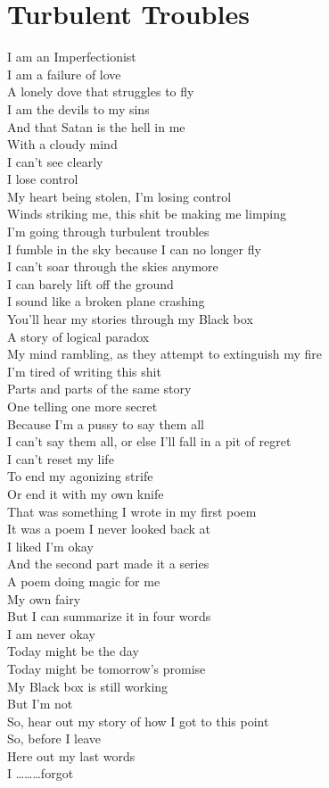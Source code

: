 \documentclass[12pt, b5paper]{article}
\begin{document}
\section{Turbulent Troubles}
I am an Imperfectionist\\
I am a failure of love\\ 
A lonely dove that struggles to fly\\
I am the devils to my sins\\ 
And that Satan is the hell in me\\ 
With a cloudy mind\\ 
I can’t see clearly\\ 
I lose control\\
My heart being stolen, I’m losing control\\
Winds striking me, this shit be making me limping\\ 
I’m going through turbulent troubles\\
I fumble in the sky because I can no longer fly\\ 
I can’t soar through the skies anymore\\
I can barely lift off the ground\\
I sound like a broken plane crashing\\
You’ll hear my stories through my Black box\\ 
A story of logical paradox\\ 
My mind rambling, as they attempt to extinguish my fire\\ 
I’m tired of writing this shit\\
Parts and parts of the same story\\
One telling one more secret\\ 
Because I’m a pussy to say them all\\
I can’t say them all, or else I’ll fall in a pit of regret\\
I can’t reset my life\\ 
To end my agonizing strife\\
Or end it with my own knife\\ 
That was something I wrote in my first poem\\ 
It was a poem I never looked back at\\
I liked I’m okay\\ 
And the second part made it a series\\
A poem doing magic for me\\
My own fairy\\ 
But I can summarize it in four words\\
I am never okay\\
Today might be the day\\
Today might be tomorrow’s promise\\ 
My Black box is still working\\
But I’m not\\
So, hear out my story of how I got to this point\\
So, before I leave\\
Here out my last words\\ 
I ………forgot 
\newpage
\end{document}
